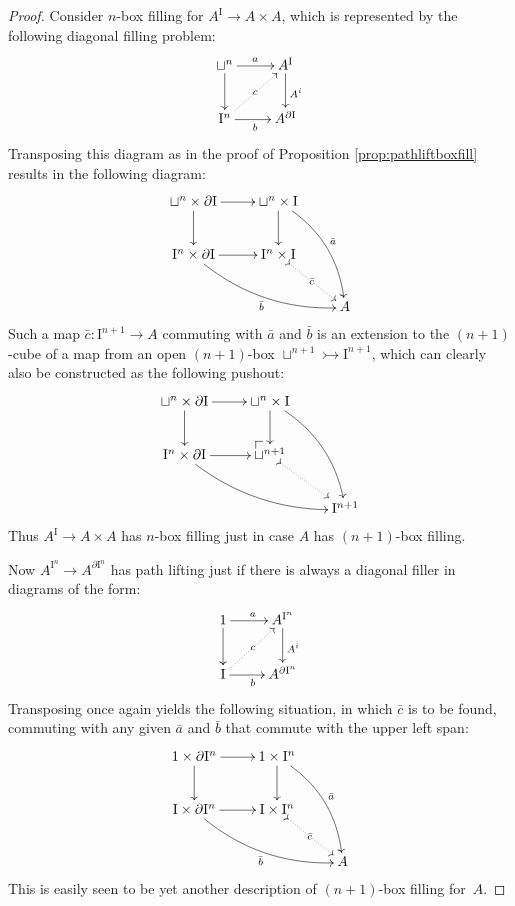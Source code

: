 \documentclass[11pt]{article}
\makeatletter
\newcommand{\pocorner}[1][dr]{\save*!/#1+1.2pc/#1:(1,-1)@^{|-}\restore}
\newcommand{\mono}{\ensuremath{\rightarrowtail}}
\newcommand{\I}{\ensuremath{\mathrm{I}}}
\theoremstyle{remark}
\theoremstyle{definition}
\makeatother
\begin{document}
\begin{proof}
Consider $n$-box filling for $A^\I \to A\times A$, which is represented by the following diagonal filling problem:
\begin{equation*}\label{diagram:pathliftpathrev}
\xymatrix{
\sqcup^n\ar[d] \ar[r]^{a} & A^\I \ar[d]^{A^i} \\
\I^n \ar[r]_{b} \ar@{..>}[ru]|{c} & A^{\partial\I}
}
\end{equation*}
Transposing this diagram as in the proof of Proposition \ref{prop:pathliftboxfill} results in the following diagram:
\begin{equation}\label{diagram:bocfillpathobject}
\xymatrix{
\sqcup^n\times \partial\I \ar[d] \ar[r]  & \sqcup^n\times \I \ar[d] \ar@/{}^{1pc}/[rdd]^{\bar{a}} \\
\I^n \times \partial\I \ar[r] \ar@/{}_{1pc}/[rrd]_{\bar{b}} & \I^n\times\I \ar@{>.>}[rd]|{\bar{c}} \\
 &&  A
}
\end{equation}
Such a map $\bar{c} : \I^{n+1} \to A$ commuting with $\bar{a}$ and $\bar{b}$ is an extension to the $(n+1)$-cube of a map from an open $(n+1)$-box $\sqcup^{n+1}\mono \I^{n+1}$, which can clearly also be constructed as the following pushout:
\begin{equation*}\label{diagram:bocfillpathobjectrev}
\xymatrix{
\sqcup^n\times \partial\I \ar[d] \ar[r]  & \sqcup^n\times \I \ar[d] \ar@/{}^{1pc}/[rdd] \\
\I^n \times \partial\I \ar[r] \ar@/{}_{1pc}/[rrd] &\sqcup^{n+1}  \pocorner \ar@{>.>}[rd] \\
 &&  \I^{n+1}
}
\end{equation*}
Thus $A^\I \to A\times A$ has $n$-box filling just in case $A$ has $(n+1)$-box filling.

Now  $A^{\I^n} \to A^{\partial\I^n}$ has path lifting just if there is always a diagonal filler in diagrams of the form:
\begin{equation*}\label{diagram:pathliftpathrev}
\xymatrix{
1 \ar[d] \ar[r]^{a} & A^{\I^n} \ar[d]^{A^i} \\
\I \ar[r]_{b} \ar@{..>}[ur]|{c}& A^{\partial\I^n}
}
\end{equation*}
Transposing once again yields the following situation, in which $\bar{c}$ is to be found, commuting with any given $\bar{a}$ and $\bar{b}$ that commute with the upper left span:
\begin{equation*}\label{diagram:bocfillpathobjectagain}
\xymatrix{
1\times \partial\I^n \ar[d] \ar[r]  & 1\times \I^n \ar[d] \ar@/{}^{1pc}/[rdd]^{\bar{a}} \\
\I \times \partial\I^n \ar[r] \ar@/{}_{1pc}/[rrd]_{\bar{b}} & \I \times \I^n \ar@{>.>}[rd]|{\bar{c}} \\
 &&  A
}
\end{equation*}
This is easily seen to be yet another description of $(n+1)$-box filling for~$A$.
\end{proof}
\end{document}
